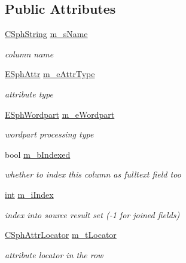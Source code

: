 \subsection*{Public Attributes}
\begin{DoxyCompactItemize}
\item 
\hyperlink{structCSphString}{C\-Sph\-String} \hyperlink{structCSphColumnInfo_ac8b08ca8f69d7bfa2dddbf080027f09e}{m\-\_\-s\-Name}
\begin{DoxyCompactList}\small\item\em column name \end{DoxyCompactList}\item 
\hyperlink{sphinxexpr_8h_aa883df0db2e4468a107fdd2d2ae625a3}{E\-Sph\-Attr} \hyperlink{structCSphColumnInfo_af245356e2540a4cd90aaf095045a477c}{m\-\_\-e\-Attr\-Type}
\begin{DoxyCompactList}\small\item\em attribute type \end{DoxyCompactList}\item 
\hyperlink{sphinx_8h_a7a49c09fe68a444e69a19f051bf9b04f}{E\-Sph\-Wordpart} \hyperlink{structCSphColumnInfo_a2aa14fd1e59d61f608ca46c9a653d8e8}{m\-\_\-e\-Wordpart}
\begin{DoxyCompactList}\small\item\em wordpart processing type \end{DoxyCompactList}\item 
bool \hyperlink{structCSphColumnInfo_ab5606279a04ace1c11ccd5be1939b10a}{m\-\_\-b\-Indexed}
\begin{DoxyCompactList}\small\item\em whether to index this column as fulltext field too \end{DoxyCompactList}\item 
\hyperlink{sphinxexpr_8cpp_a4a26e8f9cb8b736e0c4cbf4d16de985e}{int} \hyperlink{structCSphColumnInfo_aa9a9247300b6dd70ea3106e34628ff23}{m\-\_\-i\-Index}
\begin{DoxyCompactList}\small\item\em index into source result set (-\/1 for joined fields) \end{DoxyCompactList}\item 
\hyperlink{structCSphAttrLocator}{C\-Sph\-Attr\-Locator} \hyperlink{structCSphColumnInfo_add79fe460a5cecd6360fd1e2c7c15479}{m\-\_\-t\-Locator}
\begin{DoxyCompactList}\small\item\em attribute locator in the row \end{DoxyCompactList}\item 

\end{DoxyCompactItemize}

